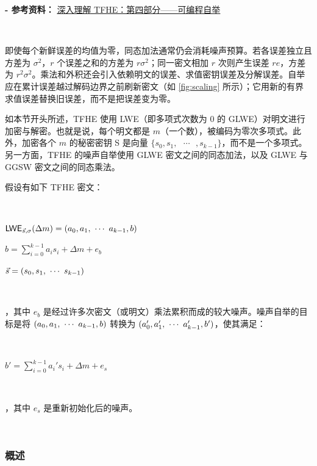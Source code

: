 \textbf{- 参考资料：}
\href{https://www.zama.ai/post/tfhe-deep-dive-part-4}{深入理解 TFHE：第四部分——可编程自举}~\cite{tfhe-4}

$ $

即使每个新鲜误差的均值为零，同态加法通常仍会消耗噪声预算。若各误差独立且方差为 $\sigma^2$，$r$ 个误差之和的方差为 $r\sigma^2$；同一密文相加 $r$ 次则产生误差 $re$，方差为 $r^2\sigma^2$。乘法和外积还会引入依赖明文的误差、求值密钥误差及分解误差。自举应在累计误差越过解码边界之前刷新密文（如 \autoref{fig:scaling} 所示）；它用新的有界求值误差替换旧误差，而不是把误差变为零。

如本节开头所述，TFHE 使用 LWE（即多项式次数为 0 的 GLWE）对明文进行加密与解密。也就是说，每个明文都是 $m$（一个数），被编码为零次多项式。此外，加密各个 $m$ 的秘密密钥 S 是向量 $ \{s_0, s_1, \text{ } \cdots \text{ }, s_{k-1} \}$，而不是一个多项式。另一方面，TFHE 的噪声自举使用 GLWE 密文之间的同态加法，以及 GLWE 与 GGSW 密文之间的同态乘法。


假设有如下 TFHE 密文：

$ $

$\textsf{LWE}_{\vec{s}, \sigma}(\Delta m) = (a_0, a_1, \text{ } \text{$\cdots$} \text{ } a_{k-1}, b)$

$b = \sum\limits_{i=0}^{k-1} a_is_i + \Delta m + e_b$

$\vec{s} = (s_0, s_1, \text{ } \text{$\cdots$} \text{ } s_{k-1})$

$ $

，其中 $e_b$ 是经过许多次密文（或明文）乘法累积而成的较大噪声。噪声自举的目标是将 $(a_0, a_1, \text{ } \text{$\cdots$} \text{ } a_{k-1}, b)$ 转换为 $(a_0', a_1', \text{ } \text{$\cdots$} \text{ } a_{k-1}', b')$，使其满足：

$ $

$b' = \sum\limits_{i=0}^{k-1} a_i's_i + \Delta m + e_s$

$ $

，其中 $e_s$ 是重新初始化后的噪声。

$ $
\subsubsection{概述}
\label{subsec:bootstrapping-overview}

